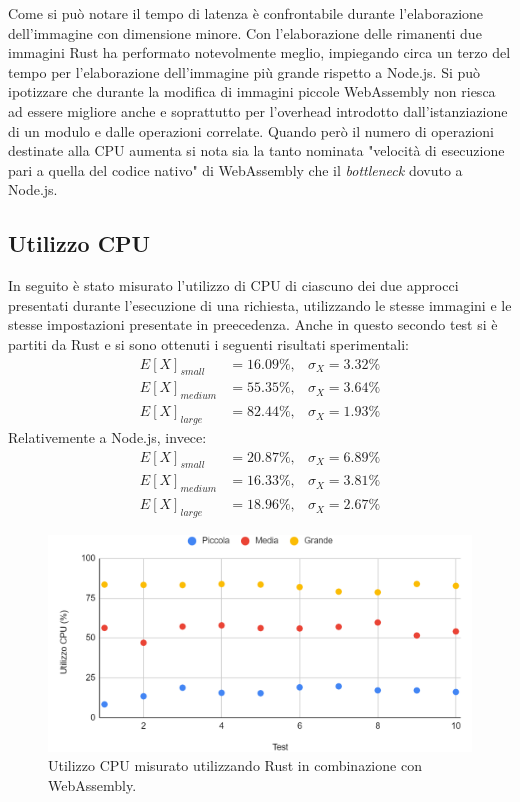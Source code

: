 Come si può notare il tempo di latenza è confrontabile durante l'elaborazione dell'immagine con dimensione minore. Con l'elaborazione delle rimanenti due immagini Rust ha performato notevolmente meglio, impiegando circa un terzo del tempo per l'elaborazione dell'immagine più grande rispetto a Node.js.
Si può ipotizzare che durante la modifica di immagini piccole WebAssembly non riesca ad essere migliore anche e soprattutto per l'overhead introdotto dall'istanziazione di un modulo e dalle operazioni correlate. Quando però il numero di operazioni destinate alla CPU aumenta si nota sia la tanto nominata "velocità di esecuzione pari a quella del codice nativo" di WebAssembly che il \emph{bottleneck} dovuto a Node.js.
\subsection{Utilizzo CPU}
In seguito è stato misurato l'utilizzo di CPU di ciascuno dei due approcci presentati durante l'esecuzione di una richiesta, utilizzando le stesse immagini e le stesse impostazioni presentate in preecedenza.
Anche in questo secondo test si è partiti da Rust e si sono ottenuti i seguenti risultati sperimentali:
\begin{align*}
    E[X]_{small}&=16.09\%,  & \sigma_X=3.32\%\\
    E[X]_{medium}&=55.35\%, & \sigma_X=3.64\%\\
    E[X]_{large}&=82.44\%,  & \sigma_X=1.93\%
\end{align*}
Relativemente a Node.js, invece:
\begin{align*}
    E[X]_{small}&=20.87\%,  & \sigma_X=6.89\%\\
    E[X]_{medium}&=16.33\%, & \sigma_X=3.81\%\\
    E[X]_{large}&=18.96\%,  & \sigma_X=2.67\%
\end{align*}
\begin{figure}
    \begin{center}
            \includegraphics[width=1\columnwidth]{images/rust_cpu.png}
    \end{center}
    \caption{Utilizzo CPU misurato utilizzando Rust in combinazione con WebAssembly.}
\end{figure}
